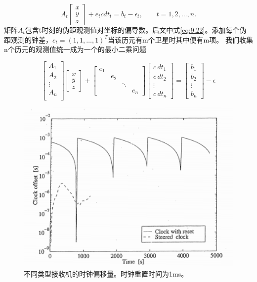 	\begin{equation}\label{eq:9.1}
	A_t 
	\begin{bmatrix}
	x \\	y \\	z
	\end{bmatrix}
	+e_tcdt_t=b_t-\epsilon _t,\qquad t = 1,2,\ldots ,n.
	\end{equation}
	矩阵$A_t$包含t时刻的伪距观测值对坐标的偏导数。后文中式\ref{eq:9.22}。添加每个伪距观测的钟差，$e_t = (1, 1,\ldots ,1 )^T$当该历元有m个卫星时其中便有m项。
	我们收集n个历元的观测值统一成为一个的最小二乘问题
	
	\begin{equation}\label{eq:9.2}
	\begin{bmatrix}
	A_1 \\	A_2 \\	\vdots \\	A_n \\
	\end{bmatrix}
	\begin{bmatrix}
	x \\	y \\	z 
	\end{bmatrix}
	+		
	\begin{bmatrix}
	e_1 & & & \\
	& e_2 & & \\	
	& & \ddots & \\	
	& & & e_n  
	\end{bmatrix}
	\begin{bmatrix}
	c\,dt_1 \\	
	c\,dt_2 \\	
	\vdots \\	
	c\,dt_n
	\end{bmatrix}
	=\begin{bmatrix}
	b_1 \\ b_2 \\ \vdots \\ b_n
	\end{bmatrix}
	-
	\epsilon
	\end{equation}
	\begin{figure}
		\centering
		\includegraphics[width=0.7\linewidth]{TeX_files/Part03/chapter09/image/9-4}
		\caption{不同类型接收机的时钟偏移量。时钟重置时间为1ms。}
		\label{fig:9-4}
	\end{figure}
	
